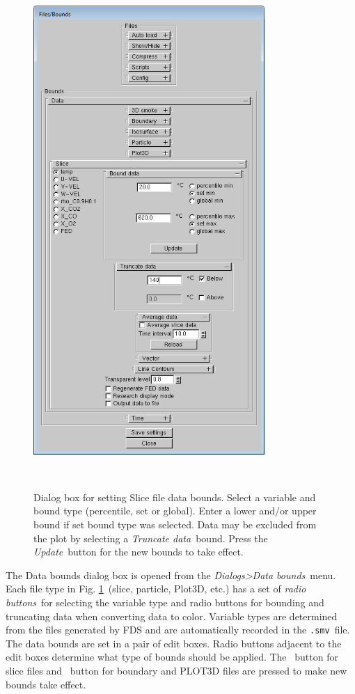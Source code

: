 \documentclass[11pt,twoside]{book}
\newcommand{\frameit}[1]{\fbox{\tt #1}}
\begin{document}
\begin{figure}[bph]
\centerline{
\includegraphics[width=3.458333in]{FIGURES/figBOUNDset}}
\caption[Dialog box for setting Slice file data bounds.]
{Dialog box for setting Slice file data bounds.
Select a variable and bound type (percentile, set or global).  Enter a lower
and/or upper bound if set bound type was selected. Data may be excluded from the plot by
selecting a {\em Truncate data}\ bound. Press the {\em Update}\ button for
the new bounds to take effect.}\ \label{figBOUNDSset}
\end{figure}


The Data bounds dialog box is opened from the {\em
Dialogs>Data bounds}\ menu. Each file type in Fig. \ref{figBOUNDSset}\
(slice, particle, Plot3D, etc.) has a set of {\em radio buttons}\
for selecting the variable type and radio buttons for bounding and truncating data when converting data to color. Variable types are determined from the files generated
by FDS and are automatically recorded in the {\tt .smv}\ file. The
data bounds are set in a pair of edit boxes. Radio buttons
adjacent to the edit boxes determine what type of bounds should be
applied.  The \frameit{Update}\ button for slice files and \frameit{Reload}\ button for boundary and PLOT3D files are
pressed to make new bounds take effect.
\end{document}
